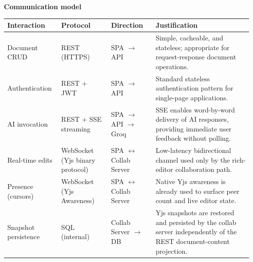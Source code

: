 \documentclass{article}
\begin{document}
\textbf{Communication model}

\noindent
{\small
\begin{tabularx}{\textwidth}{|>{\hsize=0.5\hsize\raggedright\arraybackslash}X|>{\hsize=1\hsize\raggedright\arraybackslash}X|>{\hsize=0.7\hsize\raggedright\arraybackslash}X|>{\hsize=1.8\hsize\raggedright\arraybackslash}X|}
    \hline
    \rowcolor{tableBlue}
    \textbf{\color{white}Interaction} &
    \textbf{\color{white}Protocol} &
    \textbf{\color{white}Direction} &
    \textbf{\color{white}Justification} \\
    \hline
    Document CRUD & REST (HTTPS) & SPA $\rightarrow$ API & Simple, cacheable, and stateless; appropriate for request-response document operations. \\
    \hline
    Authentication & REST + JWT & SPA $\rightarrow$ API & Standard stateless authentication pattern for single-page applications. \\
    \hline
    AI invocation & REST + SSE streaming & SPA $\rightarrow$ API $\rightarrow$ Groq & SSE enables word-by-word delivery of AI responses, providing immediate user feedback without polling. \\
    \hline
    Real-time edits & WebSocket (Yjs binary protocol) & SPA $\leftrightarrow$ Collab Server & Low-latency bidirectional channel used only by the rich-editor collaboration path. \\
    \hline
    Presence (cursors) & WebSocket (Yjs Awareness) & SPA $\leftrightarrow$ Collab Server & Native Yjs awareness is already used to surface peer count and live editor state. \\
    \hline
    Snapshot persistence & SQL (internal) & Collab Server $\rightarrow$ DB & Yjs snapshots are restored and persisted by the collab server independently of the REST document-content projection. \\
    \hline
\end{tabularx}
}
\end{document}

